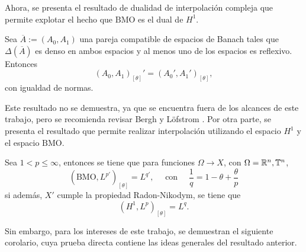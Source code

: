 Ahora, se presenta el resultado de dualidad de interpolación compleja que permite explotar el hecho que $\mathrm{BMO}$ es el dual de $H^1$.
\begin{theorem}
	Sea $\overline{A}:=(A_0, A_1)$ una pareja compatible de espacios de Banach tales que $\Delta(\overline{A})$ es denso en ambos espacios y al menos uno de los espacios es reflexivo. Entonces
	\begin{equation*}
		(A_0, A_1)_{[\theta]}' = (A_0', A_1')_{[\theta]},
	\end{equation*}
	con igualdad de normas.
\end{theorem}
Este resultado no se demuestra, ya que se encuentra fuera de los alcances de este trabajo, pero se recomienda revisar Bergh y Löfstrom \cite{bergh-lofstrom}. Por otra parte, se presenta el resultado que permite realizar interpolación utilizando el espacio $H^1$ y el espacio $\mathrm{BMO}$.
\begin{theorem}
	Sea $1<p\leq\infty$, entonces se tiene que para funciones $\Omega\to X$, con $\Omega=\mathbb{R}^n,\mathbb{T}^n$, 
	\begin{equation*}
		(\mathrm{BMO}, L^{p'})_{[\theta]} =L^{q'}, \quad \text{ con } \quad \frac{1}{q} = 1-\theta + \frac{\theta}{p}
	\end{equation*}
	si además, $X'$ cumple la propiedad Radon-Nikodym, se tiene que
	\begin{equation*}
		(H^1,L^p)_{[\theta]} = L^q.
	\end{equation*}
\end{theorem}
Sin embargo, para los intereses de este trabajo, se demuestran el siguiente corolario, cuya prueba directa contiene las ideas generales del resultado anterior.
